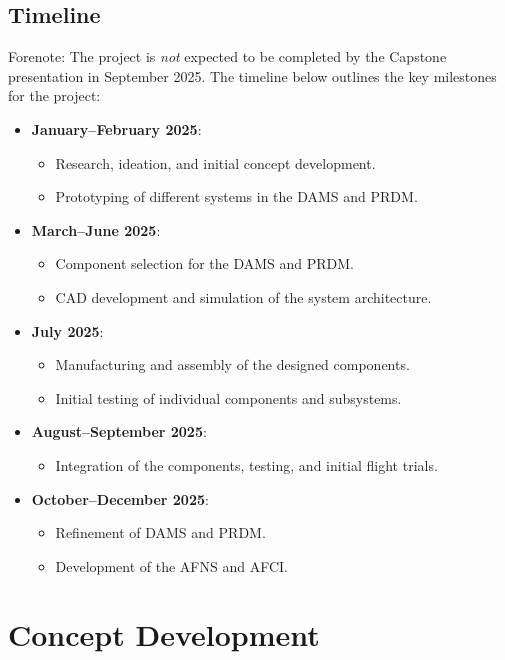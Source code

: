 \documentclass[12pt]{article}
\begin{document}
\subsection{Timeline}
Forenote: The project is \textit{not} expected to be completed by the Capstone presentation in September 2025. The timeline below outlines the key milestones for the project:
\begin{itemize}
    \item \textbf{January–February 2025}:
    \begin{itemize}
        \item Research, ideation, and initial concept development.
        \item Prototyping of different systems in the DAMS and PRDM.
    \end{itemize}
    \item \textbf{March–June 2025}:
    \begin{itemize}
        \item Component selection for the DAMS and PRDM.
        \item CAD development and simulation of the system architecture.
    \end{itemize}
    \item \textbf{July 2025}:
    \begin{itemize}
        \item Manufacturing and assembly of the designed components.
        \item Initial testing of individual components and subsystems.
    \end{itemize}
    \item \textbf{August–September 2025}:
    \begin{itemize}
        \item Integration of the components, testing, and initial flight trials.
    \end{itemize}
    \item \textbf{October–December 2025}:
    \begin{itemize}
        \item Refinement of DAMS and PRDM.
        \item Development of the AFNS and AFCI.
    \end{itemize}
\end{itemize}

\newpage
\section{Concept Development}
\end{document}
